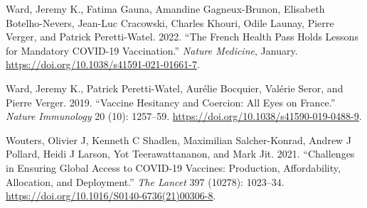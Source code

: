\documentclass[
]{article}
\newlength{\cslhangindent}
\newlength{\cslentryspacingunit} %
\newenvironment{CSLReferences}[2] %
 {%
  \setlength{\parindent}{0pt}
  \ifodd #1
  \let\oldpar\par
  \def\par{\hangindent=\cslhangindent\oldpar}
  \fi
  \setlength{\parskip}{#2\cslentryspacingunit}
 }%
 {}
\begin{document}
\begin{CSLReferences}{1}{0}
\leavevmode{}%
Ward, Jeremy K., Fatima Gauna, Amandine Gagneux-Brunon, Elisabeth
Botelho-Nevers, Jean-Luc Cracowski, Charles Khouri, Odile Launay, Pierre
Verger, and Patrick Peretti-Watel. 2022. {``The {French} Health Pass
Holds Lessons for Mandatory {COVID-19} Vaccination.''} \emph{Nature
Medicine}, January. \url{https://doi.org/10.1038/s41591-021-01661-7}.

\leavevmode{}%
Ward, Jeremy K., Patrick Peretti-Watel, Aurélie Bocquier, Valérie Seror,
and Pierre Verger. 2019. {``Vaccine Hesitancy and Coercion: All Eyes on
{France}.''} \emph{Nature Immunology} 20 (10): 1257--59.
\url{https://doi.org/10.1038/s41590-019-0488-9}.

\leavevmode{}%
Wouters, Olivier J, Kenneth C Shadlen, Maximilian Salcher-Konrad, Andrew
J Pollard, Heidi J Larson, Yot Teerawattananon, and Mark Jit. 2021.
{``Challenges in Ensuring Global Access to {COVID-19} Vaccines:
Production, Affordability, Allocation, and Deployment.''} \emph{The
Lancet} 397 (10278): 1023--34.
\url{https://doi.org/10.1016/S0140-6736(21)00306-8}.

\end{CSLReferences}
\end{document}
